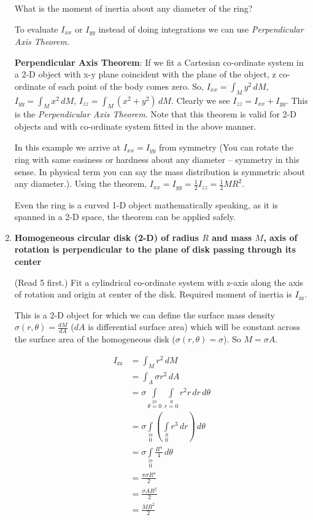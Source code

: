 \documentclass[a4paper,10pt]{article}
\begin{document}
\begin{enumerate}
What is the moment of inertia about any diameter of the ring?

To evaluate $I_{xx}$ or $I_{yy}$ instead of doing integrations we can use \emph{Perpendicular Axis Theorem}.

\textbf{Perpendicular Axis Theorem}: If we fit a Cartesian co-ordinate system in a 2-D object with x-y plane coincident with the plane of the object, z co-ordinate of each point of the body comes zero. So, $I_{xx} = \int_M y^2 \,dM$, $I_{yy} = \int_M x^2 \,dM$, $I_{zz} = \int_M (x^2+y^2) \,dM$. Clearly we see $I_{zz} = I_{xx} + I_{yy}$. This is the \emph{Perpendicular Axis Theorem}. Note that this theorem is valid for 2-D objects and with co-ordinate system fitted in the above manner.

In this example we arrive at $I_{xx} = I_{yy}$ from symmetry (You can rotate the ring with same easiness or hardness about any diameter -- symmetry in this sense. In physical term you can say the mass distribution is symmetric about any diameter.). Using the theorem, $I_{xx} = I_{yy} = \frac{1}{2}I_{zz} = \frac{1}{2}MR^2$.

Even the ring is a curved 1-D object mathematically speaking, as it is spanned in a 2-D space, the theorem can be applied safely.

\item \textbf{Homogeneous circular disk (2-D) of radius $R$ and mass $M$, axis of rotation is perpendicular to the plane of disk passing through its center}

(Read 5 first.) Fit a cylindrical co-ordinate system with z-axis along the axis of rotation and origin at center of the disk. Required moment of inertia is $I_{\text{zz}}$.

This is a 2-D object for which we can define the surface mass density $\sigma(r, \theta) = \frac{dM}{dA}$ ($dA$ is differential surface area) which will be constant across the surface area of the homogeneous disk ($\sigma(r, \theta) = \sigma$). So $M = \sigma A$.

\begin{align*}
I_\text{zz} &= \int_M r^2 \,dM\\
&= \int_A \sigma r^2 \,dA\\
&= \sigma\int\limits_{\theta=0}\limits^{2\pi}
\int\limits_{r=0}\limits^{R} r^2 r \,dr \,d\theta\\
&= \sigma\int\limits_{0}\limits^{2\pi}
\left(\int\limits_{0}\limits^{R} r^3 \,dr\right)\,d\theta\\
&= \sigma\int\limits_{0}\limits^{2\pi}
\frac{R^4}{4} \,d\theta\\
&= \frac{\pi\sigma R^4}{2}\\
&= \frac{\sigma AR^2}{2}\\
&= \frac{MR^2}{2}
\end{align*}


\end{enumerate}
\end{document}
